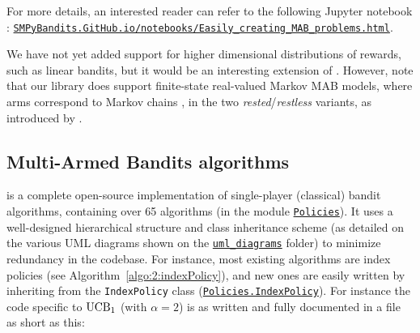 For more details, an interested reader can refer to the following Jupyter notebook \cite{jupyter}:
\href{https://smpybandits.github.io/notebooks/Easily_creating_MAB_problems.html}{\texttt{SMPyBandits.GitHub.io/notebooks/Easily\_creating\_MAB\_problems.html}}.

We have not yet added support for higher dimensional distributions of rewards, such as linear bandits, but it would be an interesting extension of \SMPyBandits.
%
However, note that our library does support finite-state real-valued Markov MAB models, where arms correspond to Markov chains \cite{Norris98}, in the two \emph{rested}/\emph{restless} variants, as introduced by \cite{Anantharam87b}.


\subsection{Multi-Armed Bandits algorithms}

\SMPyBandits{} is a complete open-source implementation of single-player (classical) bandit algorithms,
containing over 65 algorithms (in the module \texttt{\href{https://SMPyBandits.GitHub.io/docs/Policies.html}{Policies}}).
It uses a well-designed hierarchical structure and class inheritance scheme (as detailed on the various UML diagrams shown on the \texttt{\href{https://SMPyBandits.GitHub.io/uml_diagrams/README.html}{uml\_diagrams}} folder) to minimize redundancy in the codebase.
For instance, most existing algorithms are index policies (see Algorithm~\ref{algo:2:indexPolicy}), and new ones are easily written by inheriting from the \texttt{IndexPolicy} class (\texttt{\href{https://SMPyBandits.GitHub.io/docs/Policies.IndexPolicy.html}{Policies.IndexPolicy}}).
For instance the code specific to $\mathrm{UCB}_1$ (with $\alpha=2$) is as written and fully documented in a file as short as this:

\begin{small}
    \inputminted[linenos=true,numbersep=5pt,frame=lines,framesep=2mm]{python3}{2-Chapters/3-Chapter/src/example_of_a_IndexPolicy_UCB.py}
\end{small}


